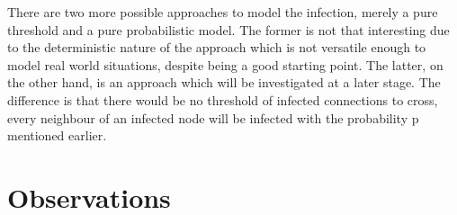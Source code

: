 \documentclass{article}
\begin{document}
There are two more possible approaches to model the infection, merely a pure threshold and a pure probabilistic model. The former is
not that interesting due to the deterministic nature of the approach which is not versatile enough to model real world situations,
despite being a good starting point. The latter, on the other hand, is an approach which will be investigated at a later stage. The difference
is that there would be no threshold of infected connections to cross, every neighbour of an infected node will be infected with the probability
p mentioned earlier.
\section{Observations}



\end{document}
